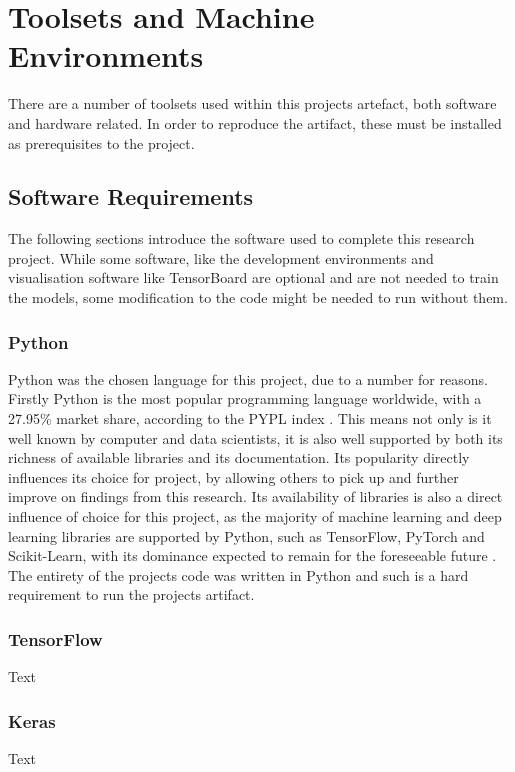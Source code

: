 \section{Toolsets and Machine Environments}
There are a number of toolsets used within this projects artefact, both software and hardware related. In order to reproduce the artifact, these must be installed as prerequisites to the project.

\subsection{Software Requirements}
The following sections introduce the software used to complete this research project. While some software, like the development environments and visualisation software like TensorBoard are optional and are not needed to train the models, some modification to the code might be needed to run without them.


\subsubsection{Python}
Python was the chosen language for this project, due to a number for reasons. Firstly Python is the most popular programming language worldwide, with a 27.95\% market share, according to the PYPL index \citep{PYPLPopu3:online}. This means not only is it well known by computer and data scientists, it is also well supported by both its richness of available libraries and its documentation. Its popularity directly influences its choice for project, by allowing others to pick up and further improve on findings from this research. Its availability of libraries is also a direct influence of choice for this project, as the majority of machine learning and deep learning libraries are supported by Python, such as TensorFlow, PyTorch and Scikit-Learn, with its dominance expected to remain for the foreseeable future \citep{info11040193}. The entirety of the projects code was written in Python and such is a hard requirement to run the projects artifact.

\subsubsection{TensorFlow}
Text

\subsubsection{Keras}
Text

